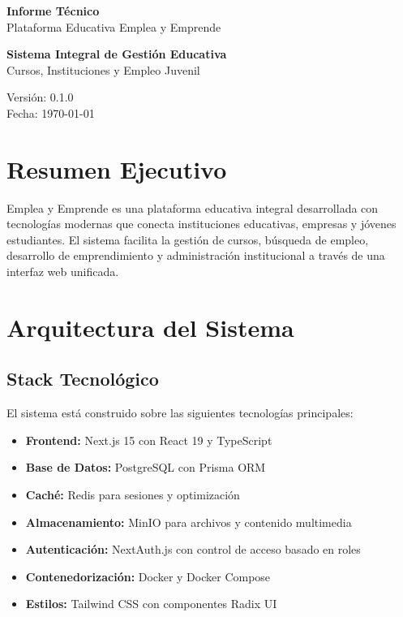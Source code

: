 \documentclass[12pt,a4paper]{article}
\begin{document}
\begin{titlepage}
    \centering
    \vspace*{2cm}

    {\Huge\bfseries Informe Técnico\\[0.5cm]}
    {\LARGE Plataforma Educativa Emplea y Emprende\\[2cm]}

    \begin{tcolorbox}[colback=blue!5!white,colframe=blue!75!black,width=0.8\textwidth]
        \centering
        \large
        \textbf{Sistema Integral de Gestión Educativa}\\
        Cursos, Instituciones y Empleo Juvenil
    \end{tcolorbox}

    \vfill

    {\large Versión: 0.1.0\\[0.5cm]}
    {\large Fecha: \today}

\end{titlepage}

\newpage
\tableofcontents
\newpage

\section{Resumen Ejecutivo}

Emplea y Emprende es una plataforma educativa integral desarrollada con tecnologías modernas que conecta instituciones educativas, empresas y jóvenes estudiantes. El sistema facilita la gestión de cursos, búsqueda de empleo, desarrollo de emprendimiento y administración institucional a través de una interfaz web unificada.

\section{Arquitectura del Sistema}

\subsection{Stack Tecnológico}

El sistema está construido sobre las siguientes tecnologías principales:

\begin{itemize}
    \item \textbf{Frontend:} Next.js 15 con React 19 y TypeScript
    \item \textbf{Base de Datos:} PostgreSQL con Prisma ORM
    \item \textbf{Caché:} Redis para sesiones y optimización
    \item \textbf{Almacenamiento:} MinIO para archivos y contenido multimedia
    \item \textbf{Autenticación:} NextAuth.js con control de acceso basado en roles
    \item \textbf{Contenedorización:} Docker y Docker Compose
    \item \textbf{Estilos:} Tailwind CSS con componentes Radix UI
\end{itemize}
\end{document}
